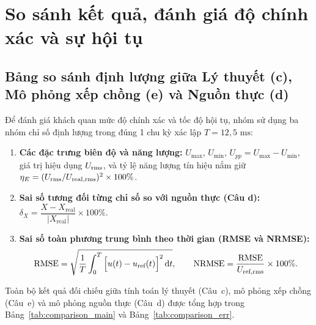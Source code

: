 \section{So sánh kết quả, đánh giá độ chính xác và sự hội tụ}

\subsection{Bảng so sánh định lượng giữa Lý thuyết (c), Mô phỏng xếp chồng (e) và Nguồn thực (d)}

Để đánh giá khách quan mức độ chính xác và tốc độ hội tụ, nhóm sử dụng ba nhóm chỉ số định lượng trong đúng 1 chu kỳ xác lập $T = 12{,}5\text{ ms}$:
\begin{enumerate}
    \item \textbf{Các đặc trưng biên độ và năng lượng:} $U_{\max}$, $U_{\min}$, $U_{pp} = U_{\max} - U_{\min}$, giá trị hiệu dụng $U_{\text{rms}}$, và tỷ lệ năng lượng tín hiệu nắm giữ $\eta_E = (U_{\text{rms}}/U_{\text{real},\text{rms}})^2 \times 100\%$.
    \item \textbf{Sai số tương đối từng chỉ số so với nguồn thực (Câu d):} $\delta_X = \dfrac{X - X_{\text{real}}}{|X_{\text{real}}|} \times 100\%$.
    \item \textbf{Sai số toàn phương trung bình theo thời gian (RMSE và NRMSE):}
    \begin{equation}
        \text{RMSE} = \sqrt{\frac{1}{T}\int_{0}^{T} \Big[u(t) - u_{\text{ref}}(t)\Big]^2 \,\mathrm{d} t}, \qquad
        \text{NRMSE} = \frac{\text{RMSE}}{U_{\text{ref},\text{rms}}} \times 100\%.
    \end{equation}
\end{enumerate}

Toàn bộ kết quả đối chiếu giữa tính toán lý thuyết (Câu~c), mô phỏng xếp chồng (Câu~e) và mô phỏng nguồn thực (Câu~d) được tổng hợp trong Bảng~\ref{tab:comparison_main} và Bảng~\ref{tab:comparison_err}.

